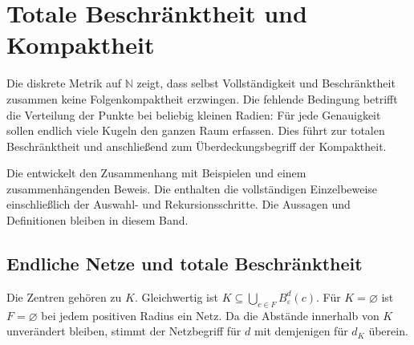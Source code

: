 \chapter{Totale Beschränktheit und Kompaktheit}
\hypertarget{compactness.main}{}

Die diskrete Metrik auf \(\mathbb N\) zeigt, dass selbst Vollständigkeit
und Beschränktheit zusammen keine Folgenkompaktheit erzwingen. Die fehlende
Bedingung betrifft die Verteilung der Punkte bei beliebig kleinen Radien:
Für jede Genauigkeit sollen endlich viele Kugeln den ganzen Raum erfassen.
Dies führt zur totalen Beschränktheit und anschließend zum
Überdeckungsbegriff der Kompaktheit.

Die \CompactnessReadingLink{} entwickelt den Zusammenhang mit Beispielen
und einem zusammenhängenden Beweis. Die \CompactnessProofsLink{} enthalten
die vollständigen Einzelbeweise einschließlich der Auswahl- und
Rekursionsschritte. Die Aussagen und Definitionen bleiben in diesem Band.

\section{Endliche Netze und totale Beschränktheit}


Die Zentren gehören zu \(K\). Gleichwertig ist
\(K\subseteq\bigcup_{c\in F}B_\varepsilon^d(c)\).
Für \(K=\varnothing\) ist \(F=\varnothing\) bei jedem positiven Radius
ein Netz. Da die Abstände innerhalb von \(K\) unverändert bleiben,
stimmt der Netzbegriff für \(d\) mit demjenigen für \(d_K\) überein.


